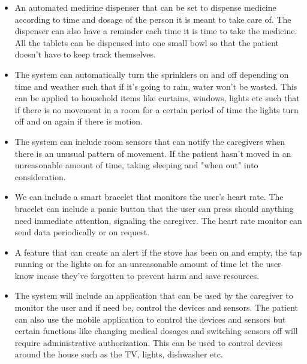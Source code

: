 \documentclass{article}
\begin{document}
	\begin{itemize}
		
		\item An automated medicine dispenser that can be set to dispense medicine according to time and dosage of the person it is meant to take care of. The dispenser can also have a reminder each time it is time to take the medicine. All the tablets can be dispensed into one small bowl so that the patient doesn't have to keep track themselves.\\
		
		\item The system can automatically turn the sprinklers on and off depending on time and weather such that if it's going to rain, water won't be wasted. This can be applied to household items like curtains, windows, lights etc such that if there is no movement in a room for a certain period of time the lights turn off and on again if there is motion. \\
		
		
		
		\item The system can include room sensors that can notify the caregivers when there is an unusual pattern of movement. If the patient hasn't moved in an unreasonable amount of time, taking sleeping and "when out" into consideration.\\
		
		
		\item We can include a smart bracelet that monitors the user's heart rate. The bracelet can include a panic button that the user can press should anything need immediate attention, signaling the caregiver. The heart rate monitor can send data periodically or on request. \\
		
		\item A feature that can create an alert if the stove has been on and empty, the tap running or the lights on for an unreasonable amount of time let the user know incase they've forgotten to prevent harm and save resources.\\
		
		\item The system will include an application that can be used by the caregiver to monitor the user and if need be, control the devices and sensors. The patient can also use the mobile application to control the devices and sensors but certain functions like changing medical dosages and switching sensors off will require administrative authorization. This can be used to control devices around the house such as the TV, lights, dishwasher etc.\\
		

\end{itemize}
\end{document}
